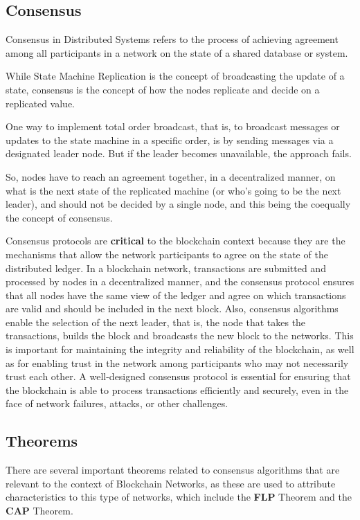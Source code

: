 \subsection*{\textbf{Consensus}}
Consensus in Distributed Systems refers to the process of achieving agreement among all participants in a network on the state of a shared database or system.

While State Machine Replication is the concept of broadcasting the update of a state, consensus is the concept of how the nodes replicate and decide on a replicated value.

One way to implement total order broadcast, that is, to broadcast messages or updates to the state machine in a specific order, is by sending messages via a designated leader node. But if the leader becomes unavailable, the approach fails. 

So, nodes have to reach an agreement together, in a decentralized manner, on what is the next state of the replicated machine (or who's going to be the next leader), and should not be decided by a single node, and this being the coequally the concept of consensus.

Consensus protocols are \textbf{critical} to the blockchain context because they are the mechanisms that allow the network participants to agree on the state of the distributed ledger. In a blockchain network, transactions are submitted and processed by nodes in a decentralized manner, and the consensus protocol ensures that all nodes have the same view of the ledger and agree on which transactions are valid and should be included in the next block. Also, consensus algorithms enable the selection of the next leader, that is, the node that takes the transactions, builds the block and broadcasts the new block to the networks. 
This is important for maintaining the integrity and reliability of the blockchain, as well as for enabling trust in the network among participants who may not necessarily trust each other. A well-designed consensus protocol is essential for ensuring that the blockchain is able to process transactions efficiently and securely, even in the face of network failures, attacks, or other challenges.




\subsection*{Theorems}
There are several important theorems related to consensus algorithms that are relevant to the context of Blockchain Networks, as these are used to attribute characteristics to this type of networks, which include the \textbf{FLP} Theorem and the \textbf{CAP} Theorem.

